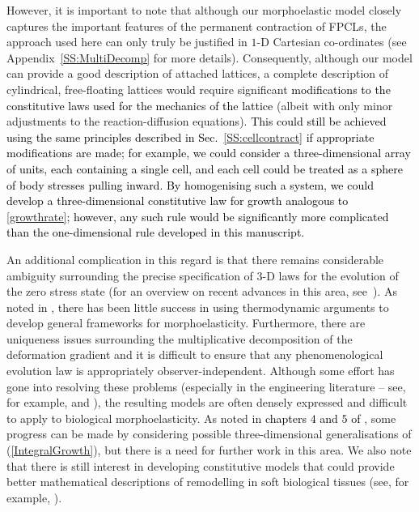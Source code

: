 However, it is important to note that although our morphoelastic model closely captures the important features of the permanent contraction of FPCLs, the approach used here can only truly be justified in $1$-D Cartesian co-ordinates (see Appendix~\ref{SS:MultiDecomp} for more details). Consequently, although our model can provide a good description of attached lattices, a complete description of cylindrical, free-floating lattices would require significant \textcolor{black}{modifications to the constitutive laws used for the mechanics of the lattice} (albeit with only minor adjustments to the reaction-diffusion equations). \textcolor{black}{This could still be achieved using the same principles described in Sec.~\ref{SS:cellcontract} if appropriate modifications are made; for example, we could consider a three-dimensional array of units, each containing a single cell, and each cell could be treated as a sphere of body stresses pulling inward. By homogenising such a system, we could develop a three-dimensional constitutive law for growth analogous to \eqref{growthrate}; however, any such rule would be significantly more complicated than the one-dimensional rule developed in this manuscript.}

An additional complication in this regard is that there remains considerable ambiguity surrounding the precise specification of $3$-D laws for the evolution of the zero stress state (for an overview on recent advances in this area, see~\citet{Kuhl2014}). As noted in \citet{Ambrosi2011}, there has been little success in using thermodynamic arguments to develop general frameworks for morphoelasticity. Furthermore, there are uniqueness issues surrounding the multiplicative decomposition of the deformation gradient and it is difficult to ensure that any phenomenological evolution law is appropriately observer-independent. Although some effort has gone into resolving these problems (especially in the engineering literature -- see, for example, \citet{LubardaElastoPlast} and \citet{Xiao2006}), the resulting models are often densely expressed and difficult to apply to biological morphoelasticity. As noted in \textcolor{black}{chapters $4$ and $5$ of} \citet{HallThesis}, some progress can be made by considering possible three-dimensional generalisations of (\ref{IntegralGrowth}), but there is a need for further work in this area. We also note that there is still interest in developing constitutive models that could provide better mathematical descriptions of remodelling in soft biological tissues (see, for example, \citet{Comellas2016}).

